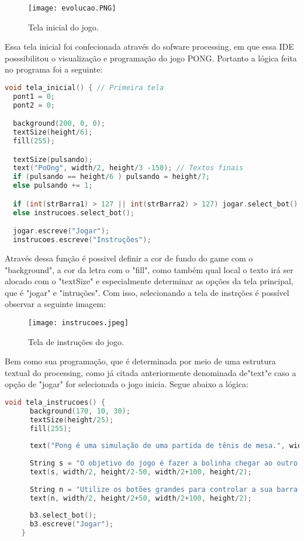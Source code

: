 \begin{figure}[htbp]
     \centerline{
        \texttt{[image: evolucao.PNG]}
        }
     \caption{Tela inicial do jogo.}
     \label{fig}
    \end{figure}
    
Essa tela inicial foi confecionada através do sofware processing, em que essa IDE posssibilitou o visualização e 
programação do jogo PONG. Portanto a lógica feita no programa foi a seguinte:

\begin{lstlisting}[language=C]
   void tela_inicial() { // Primeira tela
  pont1 = 0;
  pont2 = 0;

  background(200, 0, 0);
  textSize(height/6);
  fill(255);

  textSize(pulsando);
  text("PoOng", width/2, height/3 -150); // Textos finais
  if (pulsando == height/6 ) pulsando = height/7;
  else pulsando += 1;

  if (int(strBarra1) > 127 || int(strBarra2) > 127) jogar.select_bot();
  else instrucoes.select_bot();

  jogar.escreve("Jogar");
  instrucoes.escreve("Instruções");
\end{lstlisting}
Através dessa função é possivel definir a cor de fundo do game com o "background", a cor da letra com o "fill", 
como também qual local o texto irá ser alocado com o "textSize"  e especialmente determinar as opções da  tela principal,
que é "jogar"  e "intruções". Com isso, selecionando a tela de instrções é possível observar a seguinte imagem:

\begin{figure}[htbp]
   \centerline{
      \texttt{[image: instrucoes.jpeg]}
      }
   \caption{Tela de instruções do jogo.}
   \label{fig}
  \end{figure}

Bem como sua programação, que é determinada por meio de uma estrutura textual do processing, como já citada anteriormente
denominada de"text"e caso a opção de "jogar" for selecionada o jogo inicia. Segue abaixo a lógica: 

\begin{lstlisting}[language=C]
   void tela_instrucoes() {
      background(170, 10, 30);
      textSize(height/25);
      fill(255);
    
      text("Pong é uma simulação de uma partida de tênis de mesa.", width/2, height/4);
    
      String s = "O objetivo do jogo é fazer a bolinha chegar ao outro lado sem que seu oponente defenda e assim marcar mais pontos.";
      text(s, width/2, height/2-50, width/2+100, height/2);
    
      String n = "Utilize os botões grandes para controlar a sua barra e evite que a bola toque na parede!";
      text(n, width/2, height/2+50, width/2+100, height/2);
    
      b3.select_bot();
      b3.escreve("Jogar");
    }
\end{lstlisting}


